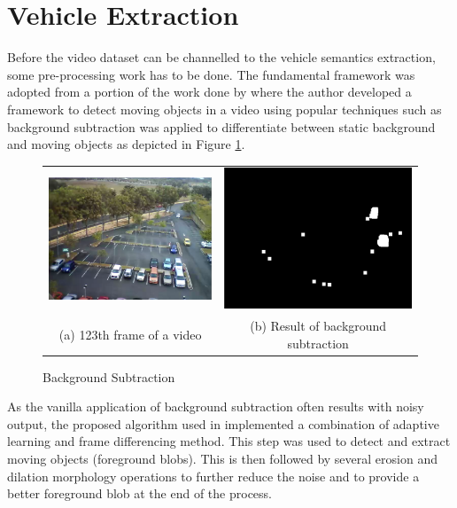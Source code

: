 \section{Vehicle Extraction}
\label{subsection:fundamental}

Before the video dataset can be channelled to the vehicle semantics extraction, some pre-processing work has to be done. The fundamental framework was adopted from a portion of the work done by \cite{lim2017} where the author developed a framework to detect moving objects in a video using popular techniques such as background subtraction was applied to differentiate between static background and moving objects as depicted in Figure \ref{fig:bgs}. 

\begin{figure}[htb!]
  \centering
\begin{tabular}{cc}
 \includegraphics[width=0.4\linewidth]{image/general/bgs1.png} &  \includegraphics[width=0.4\linewidth]{image/general/bgs2.png}  \\ 
(a) 123th frame of a video & (b) Result of background subtraction \\
\end{tabular}
\caption{Background Subtraction} 
\label{fig:bgs}
\end{figure}

As the vanilla application of background subtraction often results with noisy output, the proposed algorithm used in \cite{lim2017} implemented a combination of adaptive learning and frame differencing method. This step was used to detect and extract moving objects (foreground blobs). This is then followed by several erosion and dilation morphology operations to further reduce the noise and to provide a better foreground blob at the end of the process.

